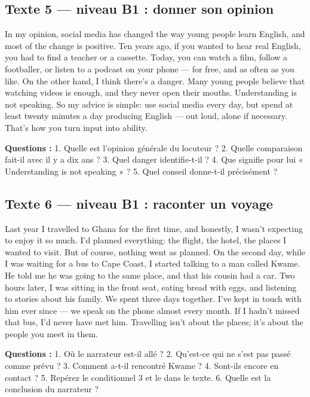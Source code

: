 \subsection{Texte 5 --- niveau B1 : donner son opinion}
\begin{dialoguebox}
\begin{anglais}
In my opinion, social media has changed the way young people learn English, and most of the
change is positive. Ten years ago, if you wanted to hear real English, you had to find a
teacher or a cassette. Today, you can watch a film, follow a footballer, or listen to a
podcast on your phone --- for free, and as often as you like. On the other hand, I think
there's a danger. Many young people believe that watching videos is enough, and they never
open their mouths. Understanding is not speaking. So my advice is simple: use social media
every day, but spend at least twenty minutes a day producing English --- out loud, alone if
necessary. That's how you turn input into ability.
\end{anglais}
\end{dialoguebox}
\textbf{Questions :} 1. Quelle est l'opinion générale du locuteur ? 2. Quelle comparaison
fait-il avec il y a dix ans ? 3. Quel danger identifie-t-il ? 4. Que signifie pour lui
« Understanding is not speaking » ? 5. Quel conseil donne-t-il précisément ?

\subsection{Texte 6 --- niveau B1 : raconter un voyage}
\begin{dialoguebox}
\begin{anglais}
Last year I travelled to Ghana for the first time, and honestly, I wasn't expecting to enjoy
it so much. I'd planned everything: the flight, the hotel, the places I wanted to visit.
But of course, nothing went as planned. On the second day, while I was waiting for a bus to
Cape Coast, I started talking to a man called Kwame. He told me he was going to the same
place, and that his cousin had a car. Two hours later, I was sitting in the front seat,
eating bread with eggs, and listening to stories about his family. We spent three days
together. I've kept in touch with him ever since --- we speak on the phone almost every
month. If I hadn't missed that bus, I'd never have met him. Travelling isn't about the
places; it's about the people you meet in them.
\end{anglais}
\end{dialoguebox}
\textbf{Questions :} 1. Où le narrateur est-il allé ? 2. Qu'est-ce qui ne s'est pas passé
comme prévu ? 3. Comment a-t-il rencontré Kwame ? 4. Sont-ils encore en contact ?
5. Repérez le conditionnel 3 et le  dans le texte.
6. Quelle est la conclusion du narrateur ?

